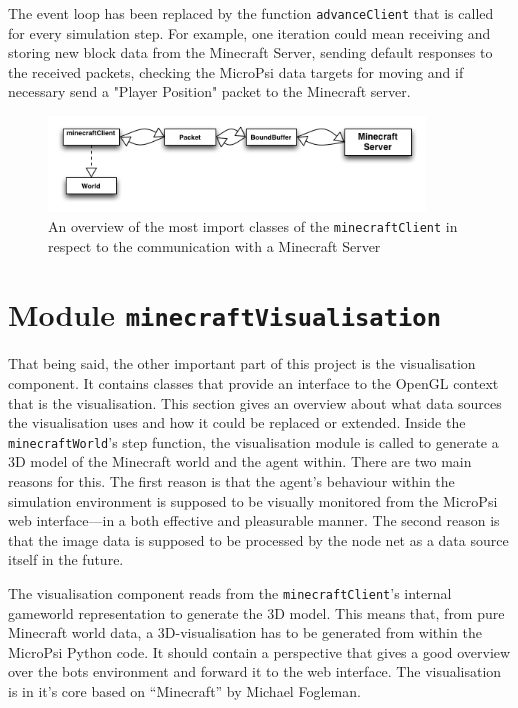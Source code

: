 The event loop has been replaced by the function \texttt{advanceClient} that is called for every simulation step. For example, one iteration could mean receiving and storing new block data from the Minecraft Server, sending default responses to the received packets, checking the MicroPsi data targets for moving and if necessary send a "Player Position" packet to the Minecraft server.

\begin{figure}[h]
  \centering
    \includegraphics[width=10cm]{graphics/spock_overview}
  \caption{An overview of the most import classes of the \texttt{minecraftClient} in respect to the communication with a Minecraft Server}
  \label{spock_overview}
\end{figure}

    \section{Module \texttt{minecraftVisualisation}}
That being said, the other important part of this project is the visualisation component. It contains classes that provide an interface to the OpenGL context that is the visualisation. This section gives an overview about what data sources the visualisation uses and how it could be replaced or extended. Inside the \texttt{minecraftWorld}'s step function, the visualisation module is called to generate a 3D model of the Minecraft world and the agent within. There are two main reasons for this. The first reason is that the agent's behaviour within the simulation environment is supposed to be visually monitored from the MicroPsi web interface---in a both effective and pleasurable manner. The second reason is that the image data is supposed to be processed by the node net as a data source itself in the future.

The visualisation component reads from the \texttt{minecraftClient}'s internal gameworld representation to generate the 3D model. This means that, from pure Minecraft world data, a 3D-visualisation has to be generated from within the MicroPsi Python code. It should contain a perspective that gives a good overview over the bots environment and forward it to the web interface. The visualisation is in it's core based on ``Minecraft'' by Michael Fogleman.

